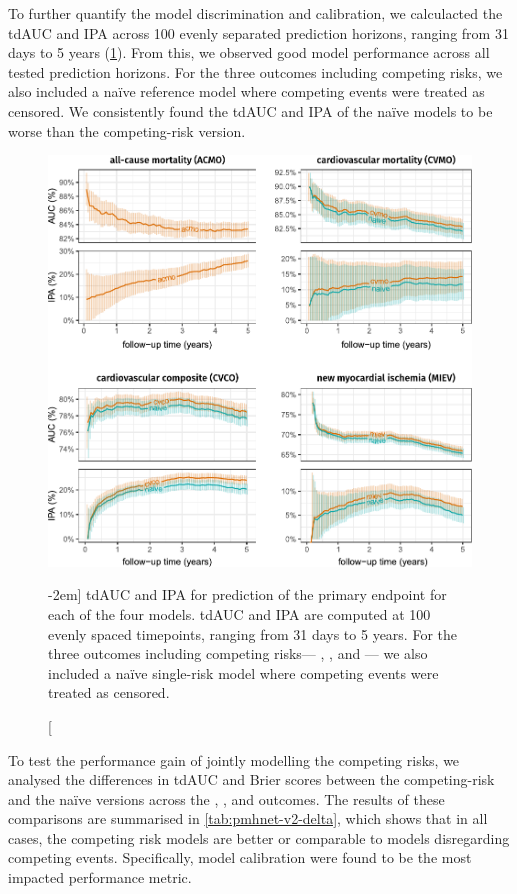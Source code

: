 To further quantify the model discrimination and calibration, 
we calculacted the \ac{tdAUC} and \ac{IPA} across 100 evenly separated
prediction horizons, ranging from 31 days to 5 years 
(\cref{fig:pmhnet-v2-performance}).
From this, we observed good model performance across
all tested prediction horizons.
For the three outcomes including competing risks,
we also included a naïve reference model where 
competing events were treated as censored.
We consistently found the \ac{tdAUC} and \ac{IPA}
of the naïve models to be worse than the competing-risk version.

\begin{figure}%
    \includegraphics{graphics/pmhnet-v2-metrics.pdf}
    \caption[Test-set performance of ][-2em]{%
        \Acf{tdAUC} and \acf{IPA} for prediction of the primary
        endpoint for each of the four  models.
        \ac{tdAUC} and \ac{IPA} are computed at 100 evenly spaced
        timepoints, ranging from 31 days to 5 years.
        For the three outcomes including competing risks---%
        , , and ---%
        we also included a naïve single-risk model where 
        competing events were treated as censored.%
    }
    \label{fig:pmhnet-v2-performance}
\end{figure}%

To test the performance gain of jointly modelling the competing
risks, we analysed the differences in \ac{tdAUC} and Brier scores
between the competing-risk and the naïve versions across
the , , and  outcomes.
The results of these comparisons are summarised in \cref{tab:pmhnet-v2-delta},
which shows that in all cases, 
the competing risk models are better or 
comparable to models disregarding competing events.
Specifically, model calibration were found to be the most impacted
performance metric.

